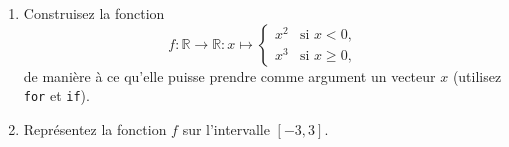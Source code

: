 \begin{exercice}\label{exoMatlab0036}

\begin{enumerate}
\item Construisez la fonction
\[ f:\mathbb{R} \rightarrow\mathbb{R} : x \mapsto
\begin{cases}
x^2 & \text{si } x<0, \\
x^3 & \text{si } x\ge 0 ,
\end{cases} \]
de manière à ce qu'elle puisse prendre comme argument un vecteur $x$ (utilisez \verb+for+ et \verb+if+).
\item Représentez la fonction $f$ sur l'intervalle $[-3,3]$.
\end{enumerate}

\end{exercice}
